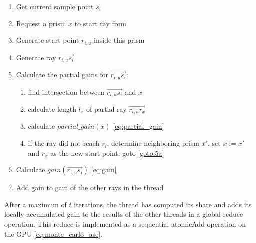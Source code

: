     \begin{enumerate}
      \item Get current sample point $s_i$
      \item Request a prism $x$ to start ray from
      \item Generate start point $r_{i,u}$ inside this prism 
      \item Generate ray $\overrightarrow{r_{i,u}s_i}$
      \item Calculate the partial gains for $\overrightarrow{r_{i,u}s_i}$:
        \begin{enumerate}
          \item find intersection between $\overrightarrow{r_{i,u}s_i}$
            and $x$\label{goto:5a}
          \item calculate length $l_x$ of partial ray $\overrightarrow{r_{i,u}r_x}$
          \item calculate $partial\_gain(x)$ \eqref{eq:partial_gain}
          \item if the ray did not reach $s_i$, determine neighboring prism $x'$,
            set $x := x'$ and $r_x$ as the new start point. goto \ref{goto:5a} 
        \end{enumerate}
      \item Calculate $gain(\overrightarrow{r_{i,u}s_i})$ \eqref{eq:gain}
      \item Add gain to gain of the other rays in the thread
    \end{enumerate}
    After a maximum of $t$ iterations, the thread has computed its share and
    adds its locally accumulated gain to the results of the other threads in a
    global reduce operation. This reduce is implemented as a sequential
    atomicAdd operation on the GPU \eqref{eq:monte_carlo_ase}.


